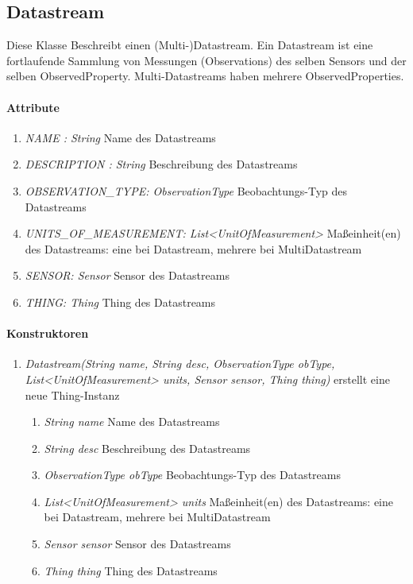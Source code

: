 \subsection{Datastream}
Diese Klasse Beschreibt einen (Multi-)Datastream. Ein Datastream ist eine fortlaufende Sammlung von Messungen (Observations) des selben Sensors und der selben ObservedProperty. Multi-Datastreams haben mehrere ObservedProperties.

\paragraph{Attribute}
\begin{enumerate}[$\bullet$]
	\item \textit{NAME : String} Name des Datastreams
	\item \textit{DESCRIPTION : String} Beschreibung des Datastreams
	\item \textit{OBSERVATION\_TYPE: ObservationType} Beobachtungs-Typ des Datastreams
	\item \textit{UNITS\_OF\_MEASUREMENT: List<UnitOfMeasurement>} Maßeinheit(en) des Datastreams: eine bei Datastream, mehrere bei MultiDatastream
	\item \textit{SENSOR: Sensor} Sensor des Datastreams
	\item \textit{THING: Thing} Thing des Datastreams
	
\end{enumerate}

\paragraph{Konstruktoren}
\begin{enumerate}[+]
	\item \textit{Datastream(String name, String desc, ObservationType obType,  List<UnitOfMeasurement> units, Sensor sensor, Thing thing)}
	erstellt eine neue Thing-Instanz
	\begin{enumerate}[$\bullet$]
		\item \textit{String name} Name des Datastreams
		\item \textit{String desc} Beschreibung des Datastreams
		\item \textit{ObservationType obType} Beobachtungs-Typ des Datastreams
		\item \textit{List<UnitOfMeasurement> units} Maßeinheit(en) des Datastreams: eine bei Datastream, mehrere bei MultiDatastream
		\item \textit{Sensor sensor} Sensor des Datastreams
		\item \textit{Thing thing} Thing des Datastreams
	\end{enumerate}
	
\end{enumerate}
